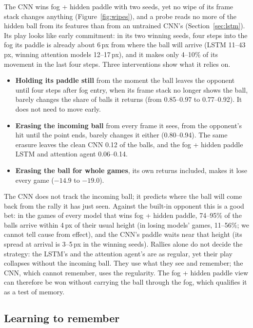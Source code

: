 \documentclass[11pt]{article}
\begin{document}
The CNN wins fog + hidden paddle with two seeds, yet no wipe of its frame stack changes anything
(Figure~\ref{fig:wipes}), and a probe reads no more of the hidden ball from its features than from an
untrained CNN's (Section~\ref{sec:lstm}). Its play looks like early commitment: in its two winning seeds,
four steps into the fog its paddle is already about 6\,px from where the ball will arrive (LSTM 11--43\,px,
winning attention models 12--17\,px), and it makes only 4--10\% of its movement in the last four steps.
Three interventions show what it relies on.
\begin{itemize}
  \item \textbf{Holding its paddle still} from the moment the ball leaves the opponent until four steps
    after fog entry, when its frame stack no longer shows the ball, barely changes the share of balls it
    returns (from 0.85--0.97 to 0.77--0.92). It does not need to move early.
  \item \textbf{Erasing the incoming ball} from every frame it sees, from the opponent's hit until the
    point ends, barely changes it either (0.80--0.94). The same erasure leaves the clean CNN 0.12 of the
    balls, and the fog + hidden paddle LSTM and attention agent 0.06--0.14.
  \item \textbf{Erasing the ball for whole games}, its own returns included, makes it lose every game
    ($-14.9$ to $-19.0$).
\end{itemize}
The CNN does not track the incoming ball; it predicts where the ball will come back from the rally it has
just seen. Against the built-in opponent this is a good bet: in the games of every model that wins fog +
hidden paddle, 74--95\% of the balls arrive within 4\,px of their usual height (in losing models' games,
11--56\%; we cannot tell cause from effect), and the CNN's paddle waits near that height (its spread at
arrival is 3--5\,px in the winning seeds). Rallies alone do not decide the strategy: the LSTM's and the
attention agent's are as regular, yet their play collapses without the incoming ball. They use what they
see and remember; the CNN, which cannot remember, uses the regularity. The fog + hidden paddle view can
therefore be won without carrying the ball through the fog, which qualifies it as a test of memory.

\subsection{Learning to remember}
\label{sec:learning}
\end{document}
